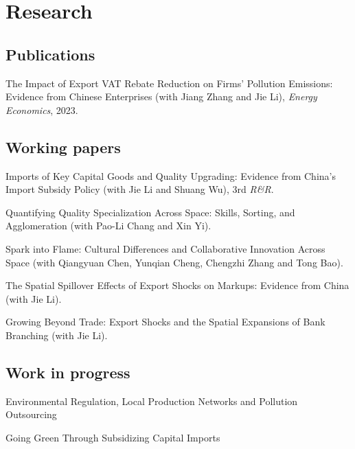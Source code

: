 \documentclass[letterpaper]{article}
\renewenvironment{itemize}{
	\begin{list}{}{
			\setlength{\leftmargin}{1.5em}
		}
	}{
	\end{list}
}
\begin{document}
	\section*{\textbf{Research}}
	\subsection*{Publications}
	
	\begin{itemize}
		\item The Impact of Export VAT Rebate Reduction on Firms' Pollution Emissions: Evidence from Chinese Enterprises  (with Jiang Zhang and Jie Li), {\it  Energy Economics}, 2023.
	\end{itemize}
	
	\subsection*{Working papers}
	
	\begin{itemize}
		\item  Imports of Key Capital Goods and Quality Upgrading: Evidence from China’s Import Subsidy Policy (with Jie Li and Shuang Wu),  3rd  \textit{R\&R}. 
	\item Quantifying Quality Specialization Across Space: Skills, Sorting, and Agglomeration (with Pao-Li Chang and Xin Yi).
	\item Spark into Flame: Cultural Differences and Collaborative Innovation Across Space (with Qiangyuan Chen, Yunqian Cheng, Chengzhi Zhang and Tong Bao).
	\item The Spatial Spillover Effects of Export Shocks on Markups: Evidence from China (with Jie Li).
	\item Growing Beyond Trade: Export Shocks and the Spatial Expansions of Bank Branching  (with Jie Li).
	\end{itemize}
	
\subsection*{Work in progress}
	
	\begin{itemize}
\item  Environmental Regulation, Local Production Networks and Pollution Outsourcing
\item Going Green Through Subsidizing Capital Imports
	\end{itemize}	
\end{document}
